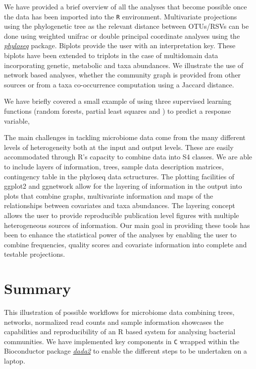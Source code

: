 \documentclass[9pt,a4paper]{extarticle}\usepackage[]{graphicx}\usepackage[]{color}
\makeatletter
\newcommand{\pkgname}[1]{\textit{#1}\xspace}
\newcommand{\CRANurl}[1]{\url{http://cran.r-project.org/package=#1}}
\def\CRANpkg{\@ifstar\@CRANpkg\@@CRANpkg}
\def\@CRANpkg#1{\href{http://cran.r-project.org/package=#1}{\pkgname{#1}}}
\def\@@CRANpkg#1{\href{http://cran.r-project.org/package=#1}{\pkgname{#1}}} %
\newcommand{\BioCpkg}[1]{\href{http://www.bioconductor.org/packages/release/bioc/html/#1.html}{\pkgname{#1}}}
\makeatother
\begin{document}
We have provided a brief overview of all the analyses that
become possible once the data has been imported into the {\tt R} environment.
Multivariate projections using the phylogenetic tree as the relevant distance between
OTUs/RSVs can be done using weighted unifrac or double principal coordinate analyses
using the \BioCpkg{phyloseq} package.
Biplots  provide the user with an interpretation key. These biplots have been extended
to triplots in the case of multidomain data incorporating genetic, metabolic and taxa abundances.
We illustrate the use of  network based analyses, whether the community graph is provided from other sources
or from a taxa co-occurrence computation using a Jaccard distance.

We have briefly covered a small example of using three
supervised learning functions (random forests, partial least squares and
) to predict a response variable,


The main challenges in tackling microbiome data come from the many
different levels of heterogeneity both at the input and output levels.
These are easily accommodated through R's capacity to combine data
into S4 classes. We are able to include layers of
information, trees, sample data description matrices, contingency table
in the phyloseq data sctructures. The plotting facilities of
\CRANpkg{ggplot2} and \CRANpkg{ggnetwork} allow for the layering of information in the output into
plots that combine graphs, multivariate information and maps of the relationships
between covariates and taxa abundances. The layering concept allows the user to provide
reproducible
publication level figures with multiple heterogeneous sources of information.
Our main goal in providing these tools has been to enhance the statistical power
of the analyses by enabling the user to combine frequencies, quality scores and
covariate information into complete and testable projections.

\section*{Summary}

This illustration of possible workflows for microbiome data combining trees, networks,
normalized read counts and sample information showcases the capabilities
and reproducibility of an R based system for analysing bacterial communities.
We have implemented key components in {\tt C} wrapped within the
Bioconductor package
\BioCpkg{dada2} to enable the different steps to be undertaken on a laptop.
\end{document}
